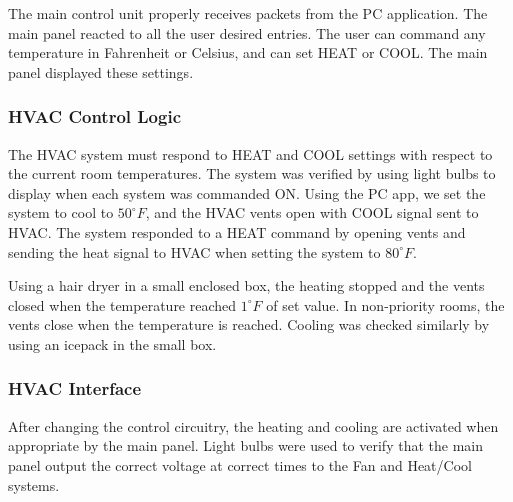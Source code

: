 The main control unit properly receives packets from the PC application.  The main panel reacted to all the user desired entries.  The user can command any temperature in Fahrenheit or Celsius, and can set HEAT or COOL.  The main panel displayed these settings.

\subsubsection{HVAC Control Logic}
The HVAC system must respond to HEAT and COOL settings with respect to the current room temperatures.  The system was verified by using light bulbs to display when each system was commanded ON.  Using the PC app, we set the system to cool to $50^\circ F$, and the HVAC vents open with COOL signal sent to HVAC.  The system responded to a HEAT command by opening vents and sending the heat signal to HVAC when setting the system to $80^\circ F$.

Using a hair dryer in a small enclosed box, the heating stopped and the vents closed when the temperature reached $1^\circ F$ of set value.  In non-priority rooms, the vents close when the temperature is reached.  Cooling was checked similarly by using an icepack in the small box.

\subsubsection{HVAC Interface}
After changing the control circuitry, the heating and cooling are activated when appropriate by the main panel.  Light bulbs were used to verify that the main panel output the correct voltage at correct times to the Fan and Heat/Cool systems.



